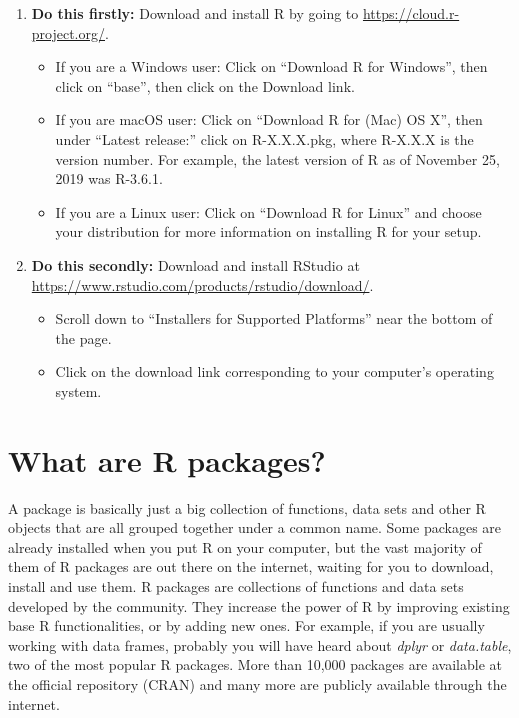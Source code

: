 \documentclass[
  12pt,
  oneside]{book}
\providecommand{\tightlist}{%
  \setlength{\itemsep}{0pt}\setlength{\parskip}{0pt}}
\theoremstyle{definition}
\theoremstyle{definition}
\theoremstyle{definition}
\theoremstyle{definition}
\theoremstyle{remark}
\begin{document}
\begin{enumerate}
\def\labelenumi{\arabic{enumi}.}
\tightlist
\item
  \textbf{Do this firstly:} Download and install R by going to \url{https://cloud.r-project.org/}. 

  \begin{itemize}
  \tightlist
  \item
    If you are a Windows user: Click on ``Download R for Windows'', then click on ``base'', then click on the Download link.
  \item
    If you are macOS user: Click on ``Download R for (Mac) OS X'', then under ``Latest release:'' click on R-X.X.X.pkg, where R-X.X.X is the version number. For example, the latest version of R as of November 25, 2019 was R-3.6.1.
  \item
    If you are a Linux user: Click on ``Download R for Linux'' and choose your distribution for more information on installing R for your setup.
  \end{itemize}
\item
  \textbf{Do this secondly:} Download and install RStudio at \url{https://www.rstudio.com/products/rstudio/download/}.

  \begin{itemize}
  \tightlist
  \item
    Scroll down to ``Installers for Supported Platforms'' near the bottom of the page.
  \item
    Click on the download link corresponding to your computer's operating system.
  \end{itemize}
\end{enumerate}

\hypertarget{packages}{%
\section{What are R packages?}\label{packages}}

A package is basically just a big collection of functions, data sets and other R objects that are all grouped together under a common name. Some packages are already installed when you put R on your computer, but the vast majority of them of R packages are out there on the internet, waiting for you to download, install and use them.
R packages are collections of functions and data sets developed by the community. They increase the power of R by improving existing base R functionalities, or by adding new ones. For example, if you are usually working with data frames, probably you will have heard about \emph{dplyr} or \emph{data.table}, two of the most popular R packages. More than 10,000 packages are available at the official repository (CRAN) and many more are publicly available through the internet.
\end{document}
